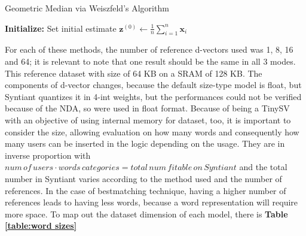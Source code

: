 \begin{algorithm}[H]
\label{algorithm:geometric media weiszfeld}
\caption{Geometric Median via Weiszfeld’s Algorithm}
\nl \textbf{Initialize:} Set initial estimate $\mathbf{z}^{(0)} \gets \frac{1}{n} \sum_{i=1}^n \mathbf{x}_i$\;
\nl {}
\end{algorithm}
For each of these methods, the number of reference d-vectors used was 1, 8, 16 and 64; it is relevant to note that one result should be the same in all 3 modes. This reference dataset with size of 64 KB on a SRAM of 128 KB. The components of d-vector changes, because the default size-type model is float, but Syntiant quantizes it in 4-int weights, but the performances could not be verified because of the NDA, so were used in float format.\newline
Because of being a TinySV with an objective of using internal memory for dataset, too, it is important to consider the size, allowing evaluation on how many words and consequently how many users can be inserted in the logic depending on the usage. They are in inverse proportion with $num\,of\,users\cdot words\,categories=total\,num\,fitable\,on\,Syntiant$ and the total number in Syntiant varies according to the method used and the number of references. In the case of bestmatching technique, having a higher number of references leads to having less words, because a word representation will require more space. To map out the dataset dimension of each model, there is \textbf{Table \ref{table:word sizes}}\newline
